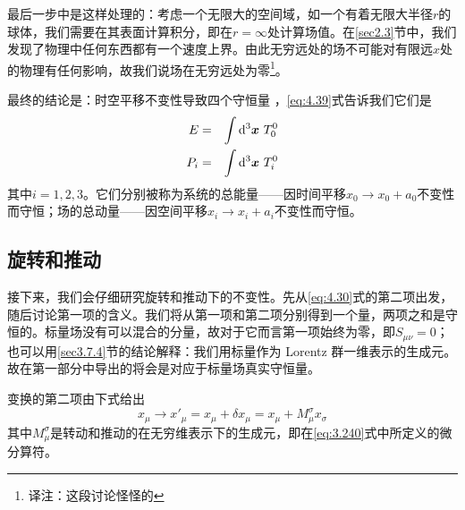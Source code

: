 最后一步中是这样处理的：考虑一个无限大的空间域，如一个有着无限大半径$r$的球体，我们需要在其表面计算积分，即在$r=\infty$处计算场值。在\ref{sec2.3}节中，我们发现了物理中任何东西都有一个速度上界。由此无穷远处的场不可能对有限远$x$处的物理有任何影响，故我们说场在无穷远处为零\footnote{译注：这段讨论怪怪的}。

最终的结论是：时空平移不变性导致四个守恒量%
%
，\ref{eq:4.39}式告诉我们它们是
\begin{eqnarray}
E &=& \int\mathrm d^3\bm{x}~T_0^0 \\
P_i &=& \int\mathrm d^3\bm{x}~T_i^0 \label{eq:4.41}
\end{eqnarray}
其中$i=1,2,3$。它们分别被称为系统的总能量——因时间平移$x_0\rightarrow x_0+a_0$不变性而守恒；场的总动量——因空间平移$x_i\rightarrow x_i+a_i$不变性而守恒。

\subsection{旋转和推动}\label{sec4.5.3}
接下来，我们会仔细研究旋转和推动下的不变性。先从\ref{eq:4.30}式的第二项出发，随后讨论第一项的含义。我们将从第一项和第二项分别得到一个量，两项之和是守恒的。标量场没有可以混合的分量，故对于它而言第一项始终为零，即$S_{\mu\nu}=0$；也可以用\ref{sec3.7.4}节的结论解释：我们用标量作为 Lorentz 群一维表示的生成元。故在第一部分中导出的将会是对应于标量场真实守恒量。

变换的第二项由下式给出
\[
x_\mu \rightarrow {x'}_\mu = x_\mu + \delta x_\mu = x_\mu + M_\mu^\sigma x_\sigma
\]
其中$M_\mu^\sigma$是转动和推动的在无穷维表示下的生成元，即在\ref{eq:3.240}式中所定义的微分算符。

